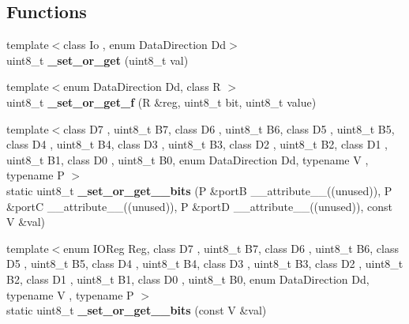 \subsection*{Functions}
\begin{DoxyCompactItemize}
\item 
{\footnotesize template$<$class Io , enum Data\+Direction Dd$>$ }\\uint8\+\_\+t {\bfseries \+\_\+set\+\_\+or\+\_\+get} (uint8\+\_\+t val)\hypertarget{namespaceALIBVR__NAMESPACE__PREFIXports_a88402236c9f05d01a4415c073310976e}{}\label{namespaceALIBVR__NAMESPACE__PREFIXports_a88402236c9f05d01a4415c073310976e}

\item 
{\footnotesize template$<$enum Data\+Direction Dd, class R $>$ }\\uint8\+\_\+t {\bfseries \+\_\+set\+\_\+or\+\_\+get\+\_\+f} (R \&reg, uint8\+\_\+t bit, uint8\+\_\+t value)\hypertarget{namespaceALIBVR__NAMESPACE__PREFIXports_a970f567562357d0f1cc2af62839197e0}{}\label{namespaceALIBVR__NAMESPACE__PREFIXports_a970f567562357d0f1cc2af62839197e0}

\item 
{\footnotesize template$<$class D7 , uint8\+\_\+t B7, class D6 , uint8\+\_\+t B6, class D5 , uint8\+\_\+t B5, class D4 , uint8\+\_\+t B4, class D3 , uint8\+\_\+t B3, class D2 , uint8\+\_\+t B2, class D1 , uint8\+\_\+t B1, class D0 , uint8\+\_\+t B0, enum Data\+Direction Dd, typename V , typename P $>$ }\\static uint8\+\_\+t {\bfseries \+\_\+set\+\_\+or\+\_\+get\+\_\+\_\+bits} (P \&portB \+\_\+\+\_\+attribute\+\_\+\+\_\+((unused)), P \&portC \+\_\+\+\_\+attribute\+\_\+\+\_\+((unused)), P \&portD \+\_\+\+\_\+attribute\+\_\+\+\_\+((unused)), const V \&val)\hypertarget{namespaceALIBVR__NAMESPACE__PREFIXports_af7eff15bec9627c29dfbc16cbf51af14}{}\label{namespaceALIBVR__NAMESPACE__PREFIXports_af7eff15bec9627c29dfbc16cbf51af14}

\item 
{\footnotesize template$<$enum I\+O\+Reg Reg, class D7 , uint8\+\_\+t B7, class D6 , uint8\+\_\+t B6, class D5 , uint8\+\_\+t B5, class D4 , uint8\+\_\+t B4, class D3 , uint8\+\_\+t B3, class D2 , uint8\+\_\+t B2, class D1 , uint8\+\_\+t B1, class D0 , uint8\+\_\+t B0, enum Data\+Direction Dd, typename V , typename P $>$ }\\static uint8\+\_\+t {\bfseries \+\_\+set\+\_\+or\+\_\+get\+\_\+\_\+bits} (const V \&val)\hypertarget{namespaceALIBVR__NAMESPACE__PREFIXports_af279d8ee10232bd3c25a4f7d85a283de}{}\label{namespaceALIBVR__NAMESPACE__PREFIXports_af279d8ee10232bd3c25a4f7d85a283de}

\end{DoxyCompactItemize}


